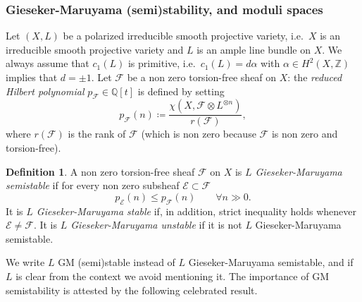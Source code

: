 \documentclass[11pt]{amsart}
\newcommand{\QQ}{{\mathbb Q}}
\newcommand{\ZZ}{{\mathbb Z}}
\let\mathcal\mathscr
\def\cE{\mathcal{E}}
\def\cF{\mathcal{F}}
\theoremstyle{definition}
\newtheorem{dfn}[lmm]{Definition}
\theoremstyle{remark}
\begin{document}
\subsubsection{Gieseker-Maruyama (semi)stability, and moduli spaces}
%
Let $(X,L)$ be a polarized irreducible smooth projective variety, i.e.~$X$ is an irreducible  smooth projective variety and $L$ is an ample line bundle on $X$. We always assume that $c_1(L)$ is primitive, i.e.~$c_1(L)=d\alpha$ with $\alpha\in H^2(X,\ZZ)$ implies that $d=\pm 1$. Let $\cF$ be a non zero torsion-free sheaf on $X$: the \emph{reduced Hilbert polynomial} 
$p_\cF\in\QQ[t]$ is defined by setting
%
\begin{equation}\label{polhilbrid}
%
p_\cF(n)\coloneqq\frac{\chi(X,\cF\otimes L^{\otimes n})}{r(\cF)},
%
\end{equation}
%
where $r(\cF)$ is the rank of $\cF$ (which is non zero because $\cF$ is non zero and torsion-free).
%
\begin{dfn}
%
A non zero torsion-free sheaf $\cF$ on $X$ is \emph{$L$ Gieseker-Maruyama  semistable} if for every non zero subsheaf 
$\cE\subset \cF$ 
%
\begin{equation}
%
p_\cE(n)\le p_\cF(n)\qquad \forall n\gg 0.
%
\end{equation}
%
It is \emph{$L$ Gieseker-Maruyama stable} if, in addition, strict inequality holds whenever $\cE\not=\cF$. It is \emph{$L$ Gieseker-Maruyama  unstable} if it is not 
$L$ Gieseker-Maruyama semistable.
%
\end{dfn}
%
We write  $L$ GM (semi)stable instead of $L$ Gieseker-Maruyama  semistable, and if $L$ is clear from the context we avoid mentioning it. The importance of GM semistability is attested by the following celebrated result.
%
\end{document}

